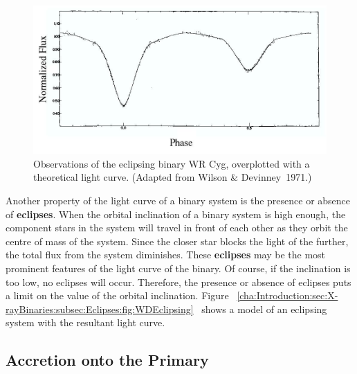 \begin{figure}[!htb]
\begin{center}
\includegraphics[width=15.0cm]{WDEclipsing}
\caption{%
Observations of the eclipsing binary WR Cyg, overplotted with a theoretical light curve. %
(Adapted from Wilson \& Devinney~1971.)%
}\label{cha:Introduction:sec:X-rayBinaries:subsec:Eclipses:fig:WDEclipsing}
\end{center}
\end{figure}
\nocite{WilsonDevinney:1971} %



Another property of the light curve of a binary system is the presence
or absence of \textbf{eclipses}. When the orbital inclination of a binary system is high enough, the component stars in the system will travel in front of each other as they orbit the centre
of mass of the system. Since the closer star blocks the light of the
further, the total flux from the system diminishes. These \textbf{eclipses} may be the most prominent features of the light curve of the
binary. Of course, if the inclination is too low, no eclipses will
occur. Therefore, the presence or absence of eclipses puts a limit on
the value of the orbital inclination. Figure~%
\vref{cha:Introduction:sec:X-rayBinaries:subsec:Eclipses:fig:WDEclipsing}%
\ shows a model of an eclipsing system with the resultant light
curve. %


\subsection{Accretion onto the Primary}\label{cha:Introduction:sec:BinaryStarSystems:subsec:Accretion}

